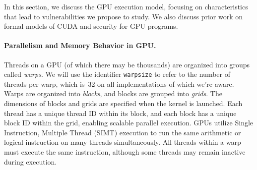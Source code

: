 \label{sec:background}
In this section, we discuss the GPU execution model, focusing on characteristics that lead to vulnerabilities we propose to study.
%
We also discuss prior work on formal models of CUDA and security for GPU programs.









\paragraph{Parallelism and Memory Behavior in GPU.}
Threads on a GPU (of which there may be thousands) are organized into groups
called {\em warps}.
%
We will use the identifier \texttt{warpsize} to refer to the number of threads
per warp, which is~32 on all implementations of which we're aware.
%
Warps are organized into {\em blocks}, and blocks are grouped into {\em grids}. The dimensions of blocks and grids are specified when the kernel is launched.
%
Each thread has a unique thread ID within its block, and each block has a unique block ID within the grid, enabling scalable parallel execution.
%
GPUs utilize Single Instruction, Multiple Thread (SIMT) execution to run the same arithmetic or logical instruction on many threads simultaneously.
%
All threads within a warp must execute the same instruction, although some threads may remain inactive during execution.

